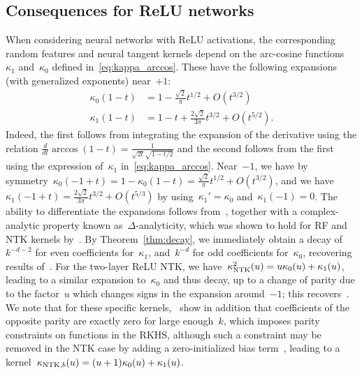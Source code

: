 \subsection{Consequences for ReLU networks}
\label{sub:deep_relu}

When considering neural networks with ReLU activations, the corresponding random features and neural tangent kernels depend on the arc-cosine functions~$\kappa_1$ and~$\kappa_0$ defined in~\eqref{eq:kappa_arccos}.
These have the following expansions (with generalized exponents) near~$+1$:
\begin{align}
\kappa_0(1 - t) &= 1 - \frac{\sqrt{2}}{\pi} t^{1/2}  + O(t^{3/2}) \label{eq:kappa0_expansion} \\
\kappa_1(1 - t) &= 1 - t + \frac{2 \sqrt{2}}{3 \pi} t^{3/2} + O(t^{5/2}). \label{eq:kappa1_expansion}
\end{align}
Indeed, the first follows from integrating the expansion of the derivative using the relation $\frac{d}{dt}\arccos(1-t) = \frac{1}{\sqrt{2t}\sqrt{1 - t/2}}$ and the second follows from the first using the expression of~$\kappa_1$ in~\eqref{eq:kappa_arccos}.
Near~$-1$, we have by symmetry~$\kappa_0(-1+t) = 1 - \kappa_0(1-t) = \frac{\sqrt{2}}{\pi} t^{1/2}  + O(t^{3/2})$, and we have $\kappa_1(-1+t) = \frac{2\sqrt{2}}{3 \pi} t^{3/2} + O(t^{5/3})$ by using~$\kappa_1' = \kappa_0$ and~$\kappa_1(-1) = 0$.
The ability to differentiate the expansions follows from~\citep[Theorem VI.8, p.419]{flajolet2009analytic}, together with a complex-analytic property known as~$\Delta$-analyticity, which was shown to hold for RF and NTK kernels by~\citet{chen2020deep}.
By Theorem~\ref{thm:decay}, we immediately obtain a decay of~$k^{-d-2}$ for even coefficients for~$\kappa_1$, and~$k^{-d}$ for odd coefficients for~$\kappa_0$, recovering results of~\citet{bach2017breaking}.
For the two-layer ReLU NTK, we have~$\kappa^2_{{\text{NTK}}}(u) = u \kappa_0(u) + \kappa_1(u)$, leading to a similar expansion to~$\kappa_0$ and thus decay, up to a change of parity due to the factor~$u$ which changes signs in the expansion around~$-1$; this recovers~\citet{bietti2019inductive}.
We note that for these specific kernels,~\citet{bach2017breaking,bietti2019inductive} show in addition that coefficients of the opposite parity are exactly zero for large enough~$k$, which imposes parity constraints on functions in the RKHS, although such a constraint may be removed in the NTK case by adding a zero-initialized bias term~\citep{basri2019convergence}, leading to a kernel~$\kappa_{{\text{NTK}},b}(u) = (u+1) \kappa_0(u) + \kappa_1(u)$.

